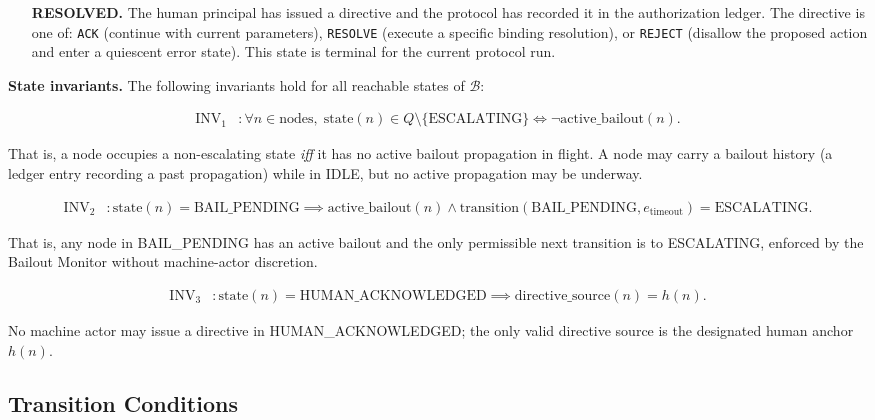 \begin{itemize}
\item[\textbf{RESOLVED.}] The human principal has issued a directive and the protocol has recorded it in the authorization ledger. The directive is one of: \texttt{ACK} (continue with current parameters), \texttt{RESOLVE} (execute a specific binding resolution), or \texttt{REJECT} (disallow the proposed action and enter a quiescent error state). This state is terminal for the current protocol run.
\end{itemize}

\bigskip
\noindent\textbf{State invariants.} The following invariants hold for all reachable states of $\mathcal{B}$:

\begin{align}
\text{INV}_1 &: \forall n \in \text{nodes},\; \text{state}(n) \in Q \setminus \{\text{ESCALATING}\} \iff \neg\text{active\_bailout}(n). \tag{INV-1}
\end{align}

That is, a node occupies a non-escalating state \emph{iff} it has no active bailout propagation in flight. A node may carry a bailout history (a ledger entry recording a past propagation) while in IDLE, but no active propagation may be underway.

\begin{align}
\text{INV}_2 &: \text{state}(n) = \text{BAIL\_PENDING} \implies \text{active\_bailout}(n) \land \text{transition}(\text{BAIL\_PENDING}, e_{\text{timeout}}) = \text{ESCALATING}. \tag{INV-2}
\end{align}

That is, any node in BAIL\_PENDING has an active bailout and the only permissible next transition is to ESCALATING, enforced by the Bailout Monitor without machine-actor discretion.

\begin{align}
\text{INV}_3 &: \text{state}(n) = \text{HUMAN\_ACKNOWLEDGED} \implies \text{directive\_source}(n) = h(n). \tag{INV-3}
\end{align}

No machine actor may issue a directive in HUMAN\_ACKNOWLEDGED; the only valid directive source is the designated human anchor $h(n)$.

\subsection{Transition Conditions}\label{sec:transitions}


